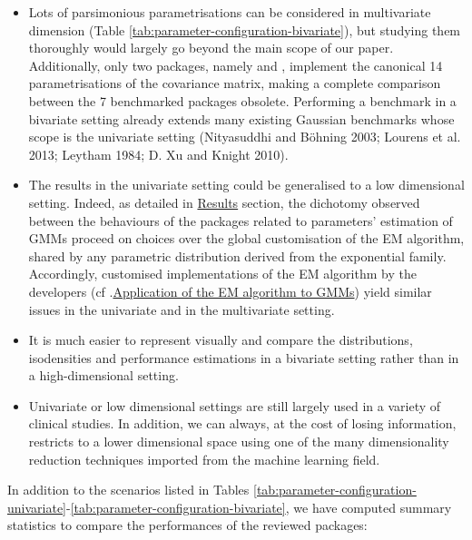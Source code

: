 \begin{itemize}
\item
  Lots of parsimonious parametrisations can be considered in multivariate dimension (Table \ref{tab:parameter-configuration-bivariate}), but studying them thoroughly would largely go beyond the main scope of our paper. Additionally, only two packages, namely  and , implement the canonical 14 parametrisations of the covariance matrix, making a complete comparison between the 7 benchmarked packages obsolete. Performing a benchmark in a bivariate setting already extends many existing Gaussian benchmarks whose scope is the univariate setting (Nityasuddhi and Böhning 2003; Lourens et al. 2013; Leytham 1984; D. Xu and Knight 2010).
\item
  The results in the univariate setting could be generalised to a low dimensional setting. Indeed, as detailed in \protect\hyperlink{results}{Results} section, the dichotomy observed between the behaviours of the packages related to parameters' estimation of GMMs proceed on choices over the global customisation of the EM algorithm, shared by any parametric distribution derived from the exponential family. Accordingly, customised implementations of the EM algorithm by the developers (cf .\protect\hyperlink{application-of-the-em-algorithm-to-gmms}{Application of the EM algorithm to GMMs}) yield similar issues in the univariate and in the multivariate setting.
\item
  It is much easier to represent visually and compare the distributions, isodensities and performance estimations in a bivariate setting rather than in a high-dimensional setting.
\item
  Univariate or low dimensional settings are still largely used in a variety of clinical studies. In addition, we can always, at the cost of losing information, restricts to a lower dimensional space using one of the many dimensionality reduction techniques imported from the machine learning field.
\end{itemize}

In addition to the scenarios listed in
Tables \ref{tab:parameter-configuration-univariate}-\ref{tab:parameter-configuration-bivariate}, we have computed summary statistics to compare the performances of the reviewed packages:

